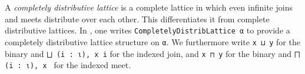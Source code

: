 A \emph{completely distributive lattice} is a complete lattice in which even infinite joins and meets distribute over each other. 
This differentiates it from complete distributive lattices. 
In \mathlib, one writes \lstinline|CompletelyDistribLattice α| to provide a completely distributive lattice structure on \lstinline|α|. 
We furthermore write \lstinline|x ⊔ y| for the binary and \lstinline|⨆ (i : ι), x i| for the indexed join, and \lstinline|x ⊓ y| for the binary and \lstinline|⨅ (i : ι), x | for the indexed meet.
